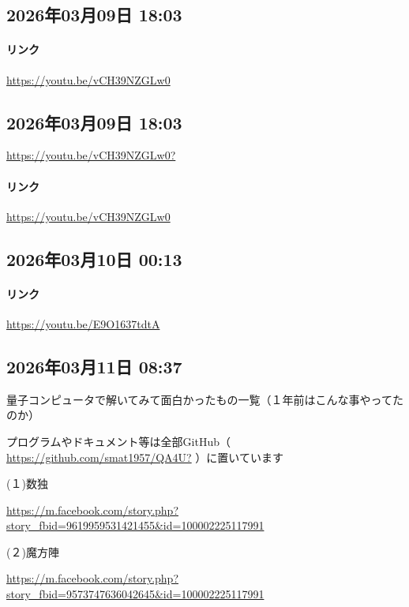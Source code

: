 \subsection*{2026年03月09日 18:03}

\paragraph{リンク}
\url{https://youtu.be/vCH39NZGLw0}

\subsection*{2026年03月09日 18:03}

\url{https://youtu.be/vCH39NZGLw0?}

\paragraph{リンク}
\url{https://youtu.be/vCH39NZGLw0}

\subsection*{2026年03月10日 00:13}

\paragraph{リンク}
\url{https://youtu.be/E9O1637tdtA}

\subsection*{2026年03月11日 08:37}

量子コンピュータで解いてみて面白かったもの一覧（１年前はこんな事やってたのか）

プログラムやドキュメント等は全部GitHub（ \url{https://github.com/smat1957/QA4U?} ）に置いています

(１)数独

\url{https://m.facebook.com/story.php?story_fbid=9619959531421455&id=100002225117991}

(２)魔方陣

\url{https://m.facebook.com/story.php?story_fbid=9573747636042645&id=100002225117991}

